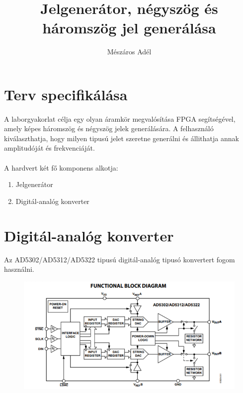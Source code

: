 \documentclass[12pt]{article}
\title{Jelgenerátor, négyszög és háromszög jel generálása}
\author{Mészáros Adél}
\begin{document}
  \maketitle
  \newpage

  \section{Terv specifikálása}
   
  \paragraph{} 
    A laborgyakorlat célja egy olyan áramkör megvalósítása FPGA segítségével,
    amely képes háromszög és négyszög jelek generálására. A felhasználó kiválaszthatja,
    hogy milyen tipusú jelet szeretne generálni és állithatja annak amplitudóját és frekvenciáját.

    \paragraph{}
    A hardvert két fő komponens alkotja: 
    
    \begin{enumerate}
      \item Jelgenerátor
      \item Digitál-analóg konverter
    \end{enumerate}

    \section{Digitál-analóg konverter}
    Az AD5302/AD5312/AD5322 tipusú digitál-analóg tipusó konvertert fogom használni.

    \begin{figure}[h]
      \includegraphics{dac_kapcs}
      \centering
    \end{figure}
\end{document}
